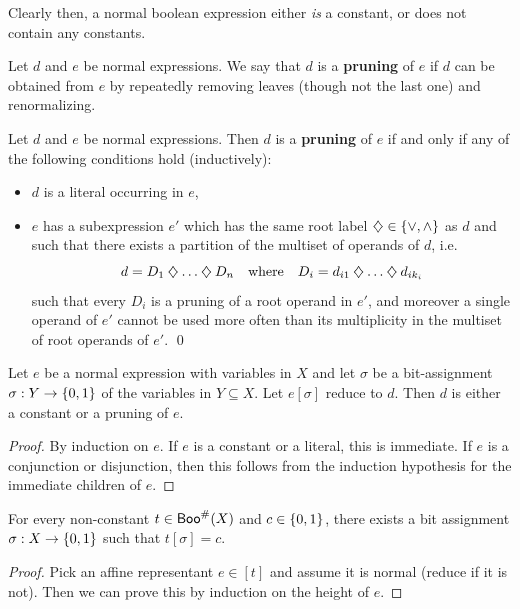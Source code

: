 \documentclass[a4paper]{memoir}
\begin{document}
Clearly then, a normal boolean expression either \emph{is} a constant, or does not contain any constants.
\begin{definition} \label{def:bool:pruning}
	Let $d$ and $e$ be normal expressions. We say that $d$ is a \textbf{pruning} of $e$ if $d$ can be obtained from $e$ by repeatedly removing leaves (though not the last one) and renormalizing.
\end{definition}
\begin{proposition} \label{thm:bool:pruning-char}
	Let $d$ and $e$ be normal expressions. Then $d$ is a \textbf{pruning} of $e$ if and only if any of the following conditions hold (inductively):
	\begin{itemize}
		\item $d$ is a literal occurring in $e$,
		\item $e$ has a subexpression $e'$ which has the same root label ${\mathbin{\diamondsuit}} \in \mathopen{}\left\{ {\vee}, {\wedge} \right\}\mathclose{}$ as $d$ and such that there exists a partition of the multiset of operands of $d$, i.e.
		\[
			d = D_1 \mathbin{\diamondsuit} \ldots \mathbin{\diamondsuit} D_n
			\quad \text{where} \quad
			D_i = d_{i1} \mathbin{\diamondsuit} \ldots \mathbin{\diamondsuit} d_{ik_i}
		\]
		such that every $D_i$ is a pruning of a root operand in $e'$, and moreover a single operand of $e'$ cannot be used more often than its multiplicity in the multiset of root operands of $e'$. \qed
	\end{itemize}
\end{proposition}
\begin{proposition} \label{thm:bool:assign-pruning}
	Let $e$ be a normal expression with variables in $X$ and let $\sigma$ be a bit-assignment $\sigma : Y \to \mathopen{}\left\{ 0, 1 \right\}\mathclose{}$ of the variables in $Y \subseteq X$.
	Let $e[\sigma]$ reduce to $d$. Then $d$ is either a constant or a pruning of $e$.
\end{proposition}
\begin{proof}
	By induction on $e$. If $e$ is a constant or a literal, this is immediate.
	If $e$ is a conjunction or disjunction, then this follows from the induction hypothesis for the immediate children of $e$.
\end{proof}
\begin{lemma} \label{thm:boolexp-to-const-assignment}
	For every non-constant $t \in \mathsf{Boo}^\#(X)$ and $c \in \mathopen{}\left\{ 0, 1 \right\}\mathclose{}$, there exists a bit assignment $\sigma : X \to \mathopen{}\left\{ 0, 1 \right\}\mathclose{}$ such that $t[\sigma] = c$.
\end{lemma}
\begin{proof}
	Pick an affine representant $e \in [t]$ and assume it is normal (reduce if it is not).
	Then we can prove this by induction on the height of $e$.
\end{proof}
\end{document}

